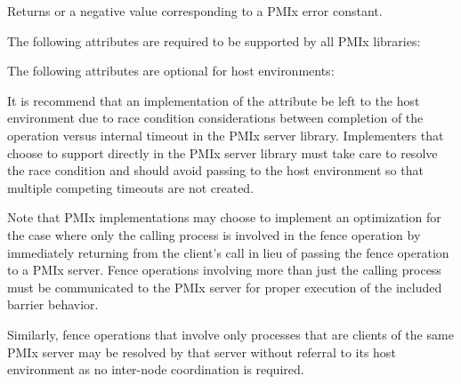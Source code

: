 \begin{arglist}
\end{arglist}

Returns  or a negative value corresponding to a PMIx error constant.

\reqattrstart
The following attributes are required to be supported by all \ac{PMIx} libraries:


\reqattrend

\optattrstart
The following attributes are optional for host environments:


\optattrend

\adviceimplstart
It is recommend that an implementation of the  attribute be left to the host environment due to race condition considerations between completion of the operation versus internal timeout in the \ac{PMIx} server library. Implementers that choose to support  directly in the \ac{PMIx} server library must take care to resolve the race condition and should avoid passing  to the host environment so that multiple competing timeouts are not created.

Note that \ac{PMIx} implementations may choose to implement an optimization for the case where only the calling process is involved in the fence operation by immediately returning  from the client's call in lieu of passing the fence operation to a \ac{PMIx} server. Fence operations involving more than just the calling process must be communicated to the \ac{PMIx} server for proper execution of the included barrier behavior.

Similarly, fence operations that involve only processes that are clients of the same \ac{PMIx} server may be resolved by that server without referral to its host environment as no inter-node coordination is required.
\adviceimplend

\descr

